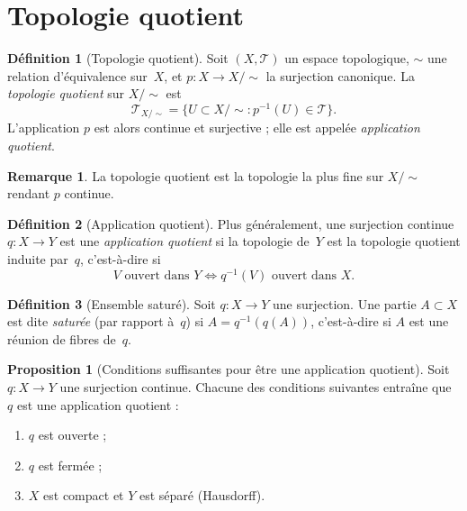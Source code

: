 \documentclass[12pt,a4paper,openany]{book}
\theoremstyle{definition}
\newtheorem{definition}{Définition}[chapter]
\theoremstyle{cours}
\newtheorem{proposition}[theoreme]{Proposition}
\theoremstyle{coursnormal}
\newtheorem{remarque}[theoreme]{Remarque}
\begin{document}
\section{Topologie quotient}
\label{sec:topologie-quotient}

\begin{definition}[Topologie quotient]
\label{def:topologie-quotient}
Soit $(X, \mathcal{T})$ un espace topologique, $\sim$ une relation d'équivalence
sur~$X$, et $p \colon X \to X/{\sim}$ la surjection canonique.
La \emph{topologie quotient} sur $X/{\sim}$ est
\[
\mathcal{T}_{X/\sim} = \bigl\{ U \subset X/{\sim} : p^{-1}(U) \in \mathcal{T} \bigr\}.
\]
L'application $p$ est alors continue et surjective ; elle est appelée
\emph{application quotient}.
\end{definition}

\begin{remarque}
\label{rem:quotient-plus-fine}
La topologie quotient est la topologie la plus fine sur $X/{\sim}$ rendant $p$ continue.
\end{remarque}

\begin{definition}[Application quotient]
\label{def:application-quotient}
Plus généralement, une surjection continue $q \colon X \to Y$ est une
\emph{application quotient} si la topologie de~$Y$ est la topologie quotient
induite par~$q$, c'est-à-dire si
\[
V \text{ ouvert dans } Y \iff q^{-1}(V) \text{ ouvert dans } X.
\]
\end{definition}

\begin{definition}[Ensemble saturé]
\label{def:sature}
Soit $q \colon X \to Y$ une surjection. Une partie $A \subset X$ est dite
\emph{saturée} (par rapport à~$q$) si $A = q^{-1}(q(A))$, c'est-à-dire si
$A$ est une réunion de fibres de~$q$.
\end{definition}

\begin{proposition}[Conditions suffisantes pour être une application quotient]
\label{prop:conditions-quotient}
Soit $q \colon X \to Y$ une surjection continue. Chacune des conditions suivantes
entraîne que $q$ est une application quotient :
\begin{enumerate}[label=(\roman*)]
  \item $q$ est ouverte ;
  \item $q$ est fermée ;
  \item $X$ est compact et $Y$ est séparé (Hausdorff).
\end{enumerate}
\end{proposition}
\end{document}

